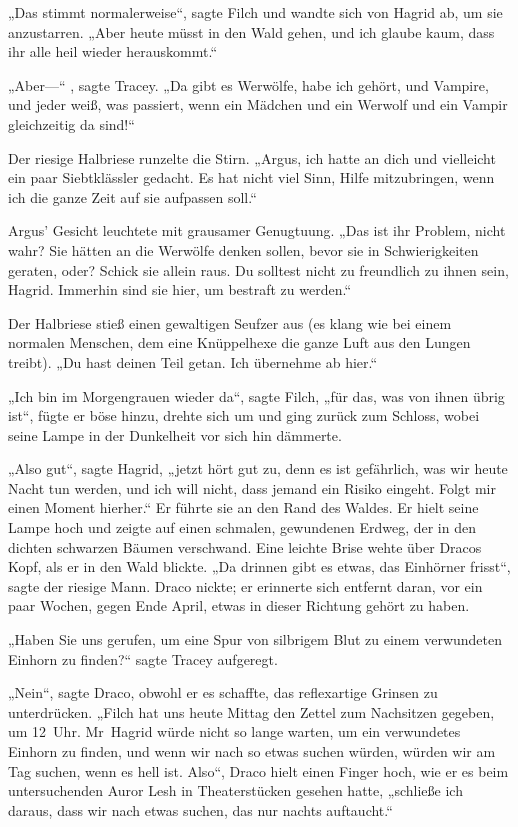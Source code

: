 {„Das stimmt normalerweise“, sagte Filch und wandte sich von Hagrid ab, um sie anzustarren. „Aber heute müsst in den Wald gehen, und ich glaube kaum, dass ihr alle heil wieder herauskommt.“

„Aber—“ , sagte Tracey. „Da gibt es Werwölfe, habe ich gehört, und Vampire, und jeder weiß, was passiert, wenn ein Mädchen und ein Werwolf und ein Vampir gleichzeitig da sind!“

Der riesige Halbriese runzelte die Stirn. „Argus, ich hatte an dich und vielleicht ein paar Siebtklässler gedacht. Es hat nicht viel Sinn, Hilfe mitzubringen, wenn ich die ganze Zeit auf sie aufpassen soll.“

Argus' Gesicht leuchtete mit grausamer Genugtuung. „Das ist ihr Problem, nicht wahr? Sie hätten an die Werwölfe denken sollen, bevor sie in Schwierigkeiten geraten, oder? Schick sie allein raus. Du solltest nicht zu freundlich zu ihnen sein, Hagrid. Immerhin sind sie hier, um bestraft zu werden.“

Der Halbriese stieß einen gewaltigen Seufzer aus (es klang wie bei einem normalen Menschen, dem eine Knüppelhexe die ganze Luft aus den Lungen treibt). „Du hast deinen Teil getan. Ich übernehme ab hier.“

„Ich bin im Morgengrauen wieder da“, sagte Filch, „für das, was von ihnen übrig ist“, fügte er böse hinzu, drehte sich um und ging zurück zum Schloss, wobei seine Lampe in der Dunkelheit vor sich hin dämmerte.

„Also gut“, sagte Hagrid, „jetzt hört gut zu, denn es ist gefährlich, was wir heute Nacht tun werden, und ich will nicht, dass jemand ein Risiko eingeht. Folgt mir einen Moment hierher.“ Er führte sie an den Rand des Waldes. Er hielt seine Lampe hoch und zeigte auf einen schmalen, gewundenen Erdweg, der in den dichten schwarzen Bäumen verschwand. Eine leichte Brise wehte über Dracos Kopf, als er in den Wald blickte. „Da drinnen gibt es etwas, das Einhörner frisst“, sagte der riesige Mann. Draco nickte; er erinnerte sich entfernt daran, vor ein paar Wochen, gegen Ende April, etwas in dieser Richtung gehört zu haben.

„Haben Sie uns gerufen, um eine Spur von silbrigem Blut zu einem verwundeten Einhorn zu finden?“ sagte Tracey aufgeregt.

„Nein“, sagte Draco, obwohl er es schaffte, das reflexartige Grinsen zu unterdrücken. „Filch hat uns heute Mittag den Zettel zum Nachsitzen gegeben, um 12~Uhr. Mr~Hagrid würde nicht so lange warten, um ein verwundetes Einhorn zu finden, und wenn wir nach so etwas suchen würden, würden wir am Tag suchen, wenn es hell ist. Also“, Draco hielt einen Finger hoch, wie er es beim untersuchenden Auror Lesh in Theaterstücken gesehen hatte, „schließe ich daraus, dass wir nach etwas suchen, das nur nachts auftaucht.“

}
